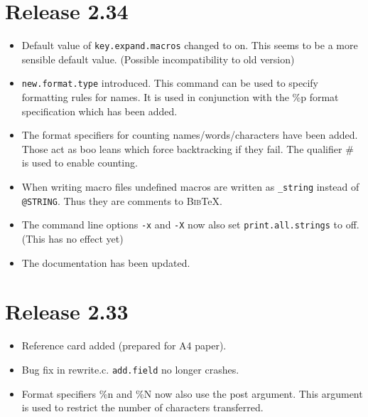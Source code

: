 \documentclass[11pt,a4paper]{scrartcl}
\newcommand\Arg[1]{\texttt{#1}}
\newcommand\rsc[1]{\texttt{#1}}
\newcommand\File[1]{\textsf{#1}}
\newcommand\BibTeX{\textsc{Bib}\TeX}
\newenvironment{Release}[2]{%
  \def\tmp{#2}%
  \section*{Release #1 \ifx\tmp\empty\else{\normalsize[#2]}\fi}
  \begin{itemize}
}{\end{itemize}}
\newenvironment{Fix}[1]{\item }{}
\newenvironment{New}[1]{\item }{}
\newenvironment{Doc}[1]{\item }{}
\newenvironment{Update}[1]{\item }{}
\begin{document}
\begin{multicols}
 \begin{Release}{2.34}{}
  \begin{Update}{gene}
    Default value of \rsc{key.expand.macros} changed to on. This seems
    to be a more sensible default value. (Possible incompatibility to old
    version)
  \end{Update}
  \begin{New}{gene}
    \rsc{new.format.type} introduced. This command can be used to
    specify formatting rules for names. It is used in conjunction with the \%p
    format specification which has been added.
  \end{New}
  \begin{New}{gene}
    The format specifiers for counting names/words/characters have been added.
    Those act as boo leans which force backtracking if they fail. The qualifier
    \# is used to enable counting.
  \end{New}
  \begin{Update}{gene}
    When writing macro files undefined macros are written as
    \verb|_string| instead of \verb|@STRING|. Thus they are
    comments to \BibTeX{}.
  \end{Update}
  \begin{Update}{gene}
    The command line options \Arg{-x} and \Arg{-X} now also set
    \rsc{print.all.strings} to off. (This has no effect yet)
  \end{Update}
  \begin{Doc}{gene}
    The documentation has been updated.
  \end{Doc}
 \end{Release}

 \begin{Release}{2.33}{}
  \begin{New}{gene}
    Reference card added (prepared for A4 paper).
  \end{New}
  \begin{Fix}{gene}
    Bug fix in \File{rewrite.c}. \rsc{add.field} no longer crashes.
  \end{Fix}
  \begin{Update}{gene}
    Format specifiers \%n and \%N now also use the post argument. This
    argument is used to restrict the number of characters transferred.
  \end{Update}
 \end{Release}


\end{multicols}
\end{document}

